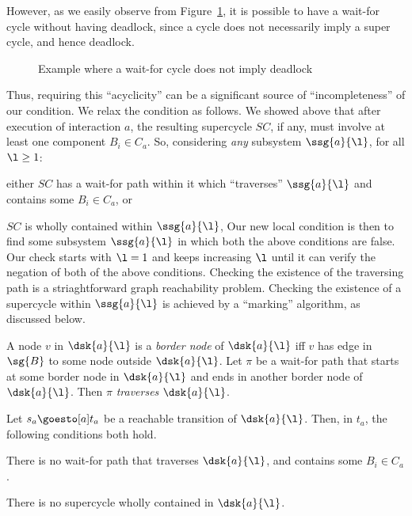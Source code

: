  However, as we easily observe from Figure~\ref{fig:cycleOK}, it is possible to have a wait-for
cycle without having deadlock, since a cycle does not necessarily imply a super
cycle, and hence deadlock. 
%
\begin{figure}[ht]
\begin{center}
\scalebox{0.5}{}
\caption{Example where a wait-for cycle does not imply deadlock}
\label{fig:cycleOK}
\end{center}
\end{figure}
%
Thus, requiring this ``acyclicity'' can be a significant source of ``incompleteness'' of our
condition. We relax the condition as follows. 
We showed above that
after execution of interaction $a$, the resulting supercycle $SC$, if any, must involve at least one component
$B_i \in C_a$. So, considering \emph{any} subsystem $\ssg{a}{\l}$, for all $\l \ge 1$:
\be
\item either $SC$ has a wait-for path within it which ``traverses'' $\ssg{a}{\l}$ and contains some $B_i \in C_a$, or 
\item $SC$ is wholly contained within $\ssg{a}{\l}$,
\ee
Our new local condition is then to find some subsystem $\ssg{a}{\l}$ in which both the above conditions are false. 
Our check starts with $\l=1$ and keeps increasing $\l$ until it can verify the negation of both of the above conditions.
Checking the existence of the traversing path is a striaghtforward graph reachability problem. 
Checking the existence of a supercycle within $\ssg{a}{\l}$ is achieved by a ``marking'' algorithm, as discussed below.

A node $v$ in $\dsk{a}{\l}$ %
 is a \emph{border node} of $\dsk{a}{\l}$ iff $v$ has edge in $\sg{B}$ to some node outside
$\dsk{a}{\l}$.
Let $\pi$ be a wait-for path that starts at some border node in $\dsk{a}{\l}$ and ends in another border node of 
$\dsk{a}{\l}$. Then $\pi$ \emph{traverses} $\dsk{a}{\l}$.




\bd[$\LCDFC(a, \l)$] \label{def:lcdfc-k}
Let $s_a \goesto[a] t_a$ be a reachable transition of $\dsk{a}{\l}$.
Then, in $t_a$, the following conditions both hold.
\bn
\item \label{def:lcdfc-k:path} There is no wait-for path that traverses $\dsk{a}{\l}$, and contains some $B_i \in C_a$.
\item \label{def:lcdfc-k:sc}   There is no supercycle wholly contained in $\dsk{a}{\l}$.
\en
\ed

